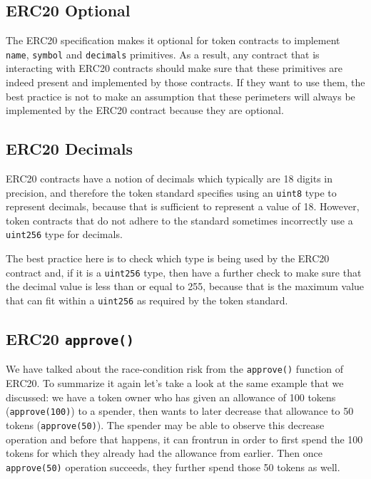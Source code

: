 \subsection{ERC20 Optional}\label{erc20-optional}

The ERC20 specification makes it optional for token contracts to
implement \texttt{name}, \texttt{symbol} and \texttt{decimals}
primitives. As a result, any contract that is interacting with ERC20
contracts should make sure that these primitives are indeed present and
implemented by those contracts. If they want to use them, the best
practice is not to make an assumption that these perimeters will always
be implemented by the ERC20 contract because they are optional.

\subsection{ERC20 Decimals}\label{erc20-decimals}

ERC20 contracts have a notion of decimals which typically are 18 digits
in precision, and therefore the token standard specifies using an
\texttt{uint8} type to represent decimals, because that is sufficient to
represent a value of 18. However, token contracts that do not adhere to
the standard sometimes incorrectly use a \texttt{uint256} type for
decimals.

The best practice here is to check which type is being used by the ERC20
contract and, if it is a \texttt{uint256} type, then have a further
check to make sure that the decimal value is less than or equal to 255,
because that is the maximum value that can fit within a \texttt{uint256}
as required by the token standard.

\subsection{\texorpdfstring{ERC20
\texttt{approve()}}{ERC20 approve()}}\label{erc20-approve}

We have talked about the race-condition risk from the \texttt{approve()}
function of ERC20. To summarize it again let's take a look at the same
example that we discussed: we have a token owner who has given an
allowance of 100 tokens (\texttt{approve(100)}) to a spender, then wants
to later decrease that allowance to 50 tokens (\texttt{approve(50)}).
The spender may be able to observe this decrease operation and before
that happens, it can frontrun in order to first spend the 100 tokens for
which they already had the allowance from earlier. Then once
\texttt{approve(50)} operation succeeds, they further spend those 50
tokens as well.

